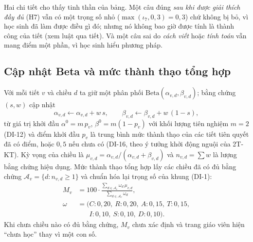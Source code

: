 Hai chi tiết cho thấy tinh thần của bảng. Một câu đúng \emph{sau khi được giải thích đầy đủ} (H7) vẫn có một trọng số nhỏ ($\max(\iota_7,0{,}3)=0{,}3$) chứ không bị bỏ, vì học sinh đã làm được điều gì đó; nhưng nó không bao giờ được tính là thành công của tiết (xem luật qua tiết). Và một câu sai do \emph{cách viết} hoặc \emph{tính toán} vẫn mang điểm một phần, vì học sinh hiểu phương pháp.

\subsection{Cập nhật Beta và mức thành thạo tổng hợp}
Với mỗi tiết $v$ và chiều $d$ ta giữ một phân phối $\mathrm{Beta}(\alpha_{v,d},\beta_{v,d})$; bằng chứng $(s,w)$ cập nhật
\begin{equation}
\alpha_{v,d}\leftarrow\alpha_{v,d}+w\,s,\qquad \beta_{v,d}\leftarrow\beta_{v,d}+w\,(1-s),
\end{equation}
từ giá trị khởi đầu $\alpha^0=m\,p_v$, $\beta^0=m(1-p_v)$ với khối lượng tiên nghiệm $m=2$ (DI-12) và điểm khởi đầu $p_v$ là trung bình mức thành thạo của các tiết tiên quyết đã có điểm, hoặc $0{,}5$ nếu chưa có (DI-16, theo ý tưởng khởi động nguội của 2T-KT). Kỳ vọng của chiều là $\mu_{v,d}=\alpha_{v,d}/(\alpha_{v,d}+\beta_{v,d})$ và $n_{v,d}=\sum w$ là lượng bằng chứng hiệu dụng. Mức thành thạo tổng hợp lấy các chiều đã có đủ bằng chứng $\mathcal{A}_v=\{d:n_{v,d}\ge1\}$ và chuẩn hóa lại trọng số của khung (DI-1):
\begin{equation}
\begin{split}
M_v&=100\cdot\frac{\sum_{d\in\mathcal{A}_v}\omega_d\,\mu_{v,d}}{\sum_{d\in\mathcal{A}_v}\omega_d},\\
\omega&=(C\!:\!0{,}20,\ R\!:\!0{,}20,\ A\!:\!0{,}15,\ T\!:\!0{,}15,\\
&\phantom{={}(}I\!:\!0{,}10,\ S\!:\!0{,}10,\ D\!:\!0{,}10).
\end{split}
\end{equation}
Khi chưa chiều nào có đủ bằng chứng, $M_v$ chưa xác định và trang giáo viên hiện ``chưa học'' thay vì một con số.

